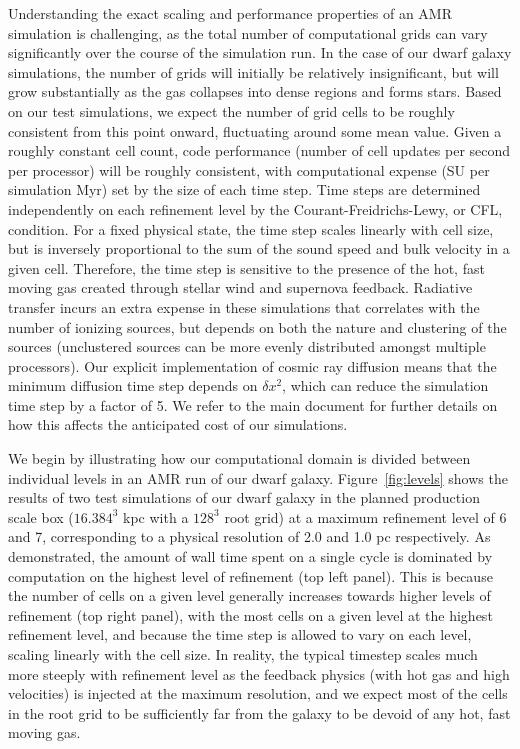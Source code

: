 \documentclass[11pt]{article}
\begin{document}
Understanding the exact scaling and performance properties of an AMR simulation is challenging, as the total number of computational grids can vary significantly over the course of the simulation run. In the case of our dwarf galaxy simulations, the number of grids will initially be relatively insignificant, but will grow substantially as the gas collapses into dense regions and forms stars. Based on our test simulations, we expect the number of grid cells to be roughly consistent from this point onward, fluctuating around some mean value. Given a roughly constant cell count, code performance (number of cell updates per second per processor) will be roughly consistent, with computational expense (SU per simulation Myr) set by the size of each time step. Time steps are determined independently on each refinement level by the Courant-Freidrichs-Lewy, or CFL, condition. For a fixed physical state, the time step scales linearly with cell size, but is inversely proportional to the sum of the sound speed and bulk velocity in a given cell. Therefore, the time step is sensitive to the presence of the hot, fast moving gas created through stellar wind and supernova feedback. Radiative transfer incurs an extra expense in these simulations that correlates with the number of ionizing sources, but depends on both the nature and clustering of the sources (unclustered sources can be more evenly distributed amongst multiple processors). Our explicit implementation of cosmic ray diffusion means that the minimum diffusion time step depends on $\delta x^2$, which can reduce the simulation time step by a factor of 5. We refer to the main document for further details on how this affects the anticipated cost of our simulations.


We begin by illustrating how our computational domain is divided between individual levels in an AMR run of our dwarf galaxy. Figure~\ref{fig:levels} shows the results of two test simulations of our dwarf galaxy in the planned production scale box ($16.384^3$ kpc with a $128^3$ root grid) at a maximum refinement level of 6 and 7, corresponding to a physical resolution of 2.0 and 1.0 pc respectively. As demonstrated, the amount of wall time spent on a single cycle is dominated by computation on the highest level of refinement (top left panel). This is because the number of cells on a given level generally increases towards higher levels of refinement (top right panel), with the most cells on a given level at the highest refinement level, and because the time step is allowed to vary on each level, scaling linearly with the cell size. In reality, the typical timestep scales much more steeply with refinement level as the feedback physics (with hot gas and high velocities) is injected at the maximum resolution, and we expect most of the cells in the root grid to be sufficiently far from the galaxy to be devoid of any hot, fast moving gas. 
\end{document}
